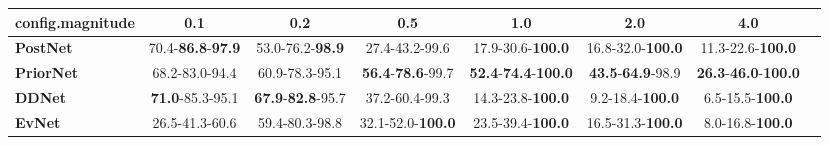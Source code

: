 \begin{tabular}{lccccccc}
\toprule
\textbf{config.magnitude} &                               0.1 &                               0.2 &                               0.5 &                                         1.0 &                               2.0 &                                         4.0 \\
\midrule
\textbf{PostNet } &  70.4-\textbf{86.8}-\textbf{97.9} &           53.0-76.2-\textbf{98.9} &                    27.4-43.2-99.6 &                    17.9-30.6-\textbf{100.0} &          16.8-32.0-\textbf{100.0} &                    11.3-22.6-\textbf{100.0} \\
\textbf{PriorNet} &                    68.2-83.0-94.4 &                    60.9-78.3-95.1 &  \textbf{56.4}-\textbf{78.6}-99.7 &  \textbf{52.4}-\textbf{74.4}-\textbf{100.0} &  \textbf{43.5}-\textbf{64.9}-98.9 &  \textbf{26.3}-\textbf{46.0}-\textbf{100.0} \\
\textbf{DDNet   } &           \textbf{71.0}-85.3-95.1 &  \textbf{67.9}-\textbf{82.8}-95.7 &                    37.2-60.4-99.3 &                    14.3-23.8-\textbf{100.0} &           9.2-18.4-\textbf{100.0} &                     6.5-15.5-\textbf{100.0} \\
\textbf{EvNet   } &                    26.5-41.3-60.6 &                    59.4-80.3-98.8 &          32.1-52.0-\textbf{100.0} &                    23.5-39.4-\textbf{100.0} &          16.5-31.3-\textbf{100.0} &                     8.0-16.8-\textbf{100.0} \\
\bottomrule
\end{tabular}
